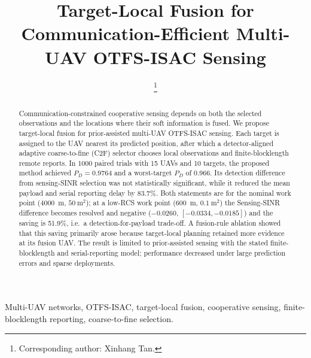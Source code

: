 \documentclass[conference]{IEEEtran}
\begin{document}
	
	\title{Target-Local Fusion for Communication-Efficient Multi-UAV OTFS-ISAC Sensing}
	
	\author{
		\thanks{Corresponding author: Xinhang Tan.}
	}
	\maketitle
	

	\begin{abstract}
		Communication-constrained cooperative sensing depends on both the selected
		observations and the locations where their soft information is fused. We
		propose target-local fusion for prior-assisted multi-UAV OTFS-ISAC sensing.
		Each target is assigned to the UAV nearest its predicted position, after
		which a detector-aligned adaptive coarse-to-fine (C2F) selector chooses local
		observations and finite-blocklength remote reports. In 1000 paired trials with
		15 UAVs and 10 targets, the proposed method achieved $P_D=0.9764$ and a
		worst-target $P_D$ of 0.966. Its detection difference from sensing-SINR
		selection was not statistically significant, while it reduced the mean payload and serial
		reporting delay by 83.7\%. Both statements are for the nominal work point
		($4000$~m, $50~\mathrm m^2$); at a low-RCS work point ($600$~m,
		$0.1~\mathrm m^2$) the Sensing-SINR difference becomes resolved and
		negative ($-0.0260$, $[-0.0334,-0.0185]$) and the saving is 51.9\%,
		i.e.\ a detection-for-payload trade-off. A fusion-rule ablation showed that this saving
		primarily arose because target-local planning retained more evidence at its
		fusion UAV. The result is limited to prior-assisted sensing with the stated
		finite-blocklength and serial-reporting model; performance decreased under
		large prediction errors and sparse deployments.
	\end{abstract}

	\begin{IEEEkeywords}
		Multi-UAV networks, OTFS-ISAC, target-local fusion, cooperative sensing,
		finite-blocklength reporting, coarse-to-fine selection.
	\end{IEEEkeywords}


	
	
	
	
	
	
	
\end{document}
